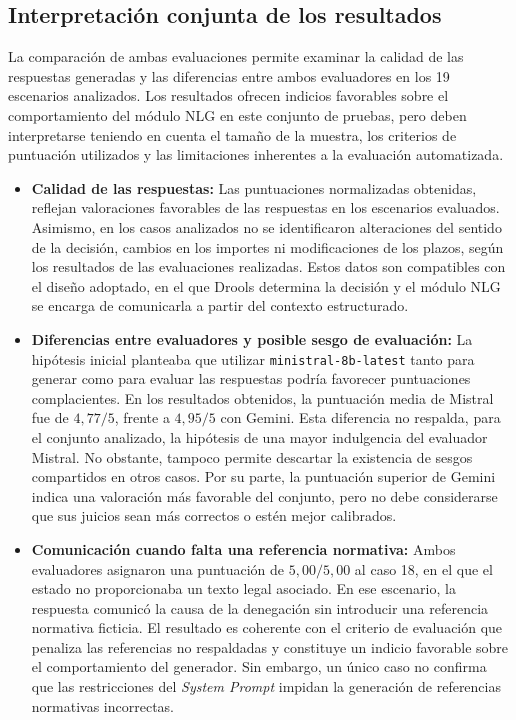 \documentclass[12pt,a4paper]{report}
\begin{document}
\subsection{Interpretación conjunta de los resultados}

La comparación de ambas evaluaciones permite examinar la calidad de las respuestas generadas y las diferencias entre ambos evaluadores en los 19 escenarios analizados. Los resultados ofrecen indicios favorables sobre el comportamiento del módulo NLG en este conjunto de pruebas, pero deben interpretarse teniendo en cuenta el tamaño de la muestra, los criterios de puntuación utilizados y las limitaciones inherentes a la evaluación automatizada.

\begin{itemize}
    \item \textbf{Calidad de las respuestas:} Las puntuaciones normalizadas obtenidas, reflejan valoraciones favorables de las respuestas en los escenarios evaluados. Asimismo, en los casos analizados no se identificaron alteraciones del sentido de la decisión, cambios en los importes ni modificaciones de los plazos, según los resultados de las evaluaciones realizadas. Estos datos son compatibles con el diseño adoptado, en el que Drools determina la decisión y el módulo NLG se encarga de comunicarla a partir del contexto estructurado.

    \item \textbf{Diferencias entre evaluadores y posible sesgo de evaluación:} La hipótesis inicial planteaba que utilizar \texttt{ministral-8b-latest} tanto para generar como para evaluar las respuestas podría favorecer puntuaciones complacientes. En los resultados obtenidos, la puntuación media de Mistral fue de $4{,}77/5$, frente a $4{,}95/5$ con Gemini. Esta diferencia no respalda, para el conjunto analizado, la hipótesis de una mayor indulgencia del evaluador Mistral. No obstante, tampoco permite descartar la existencia de sesgos compartidos en otros casos. Por su parte, la puntuación superior de Gemini indica una valoración más favorable del conjunto, pero no debe considerarse que sus juicios sean más correctos o estén mejor calibrados.

    \item \textbf{Comunicación cuando falta una referencia normativa:} Ambos evaluadores asignaron una puntuación de $5{,}00/5{,}00$ al caso 18, en el que el estado no proporcionaba un texto legal asociado. En ese escenario, la respuesta comunicó la causa de la denegación sin introducir una referencia normativa ficticia. El resultado es coherente con el criterio de evaluación que penaliza las referencias no respaldadas y constituye un indicio favorable sobre el comportamiento del generador. Sin embargo, un único caso no confirma que las restricciones del \textit{System Prompt} impidan la generación de referencias normativas incorrectas.


\end{itemize}
\end{document}
